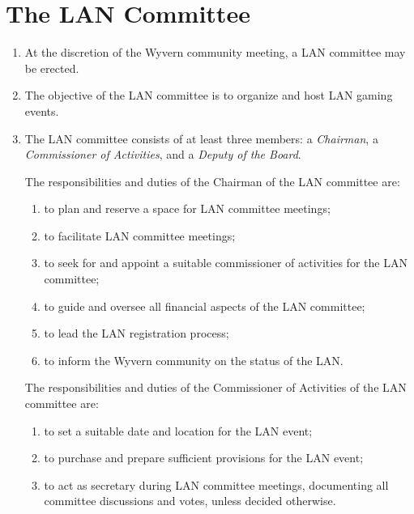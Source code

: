 \section{The LAN Committee}

\begin{enumerate}
    \item At the discretion of the Wyvern community meeting, a LAN committee may be erected.

    \item The objective of the LAN committee is to organize and host LAN gaming events.
    
    \item The LAN committee consists of at least three members: a \textit{Chairman}, a \textit{Commissioner of Activities}, and a \textit{Deputy of the Board}.

    \begin{item}
        The responsibilities and duties of the Chairman of the LAN committee are:
        \begin{enumerate}
            \item to plan and reserve a space for LAN committee meetings;
            \item to facilitate LAN committee meetings;
            \item to seek for and appoint a suitable commissioner of activities for the LAN committee;
            \item to guide and oversee all financial aspects of the LAN committee;
            \item to lead the LAN registration process;
            \item to inform the Wyvern community on the status of the LAN.
        \end{enumerate}
    \end{item}
    
    \begin{item}
        The responsibilities and duties of the Commissioner of Activities of the LAN committee are:
        \begin{enumerate}
            \item to set a suitable date and location for the LAN event;
            \item to purchase and prepare sufficient provisions for the LAN event;
            \item to act as secretary during LAN committee meetings, documenting all committee discussions and votes, unless decided otherwise.
        \end{enumerate}
    \end{item}


\end{enumerate}
